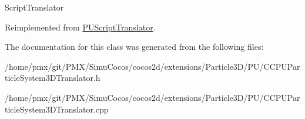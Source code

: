 Script\+Translator 

Reimplemented from \hyperlink{classPUScriptTranslator_a9ff2cdfda9ea8db6fd716e7b69dbe79b}{P\+U\+Script\+Translator}.



The documentation for this class was generated from the following files\+:\begin{DoxyCompactItemize}
\item 
/home/pmx/git/\+P\+M\+X/\+Simu\+Cocos/cocos2d/extensions/\+Particle3\+D/\+P\+U/C\+C\+P\+U\+Particle\+System3\+D\+Translator.\+h\item 
/home/pmx/git/\+P\+M\+X/\+Simu\+Cocos/cocos2d/extensions/\+Particle3\+D/\+P\+U/C\+C\+P\+U\+Particle\+System3\+D\+Translator.\+cpp\end{DoxyCompactItemize}
